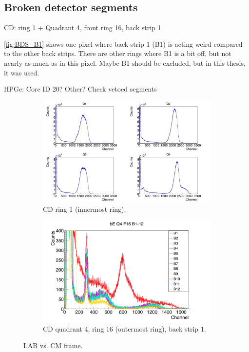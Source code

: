\documentclass[twoside,english]{uiofysmaster/uiofysmaster}
\begin{document}
\subsection{Broken detector segments}

CD: ring 1 + Quadrant 4, front ring 16, back strip 1 \newline

\autoref{fig:BDS_B1} shows one pixel where back strip 1 (B1) is acting weird compared to the other back strips. There are other rings where B1 is a bit off, but not nearly as much as in this pixel. Maybe B1 should be excluded, but in this thesis, it was used. 

\bigskip

HPGe: Core ID 20? Other? Check vetoed segments


\begin{figure}[ht]
	\centering
	\begin{subfigure}{\textwidth}
		\centering
		\includegraphics[width=\textwidth]{../Plots/plotting/Q1-4_f1.png}
		\caption{CD ring 1 (innermost ring).}
		\label{fig:BDS_R1}
	\end{subfigure}
	\begin{subfigure}{\textwidth}
		\centering
		\includegraphics[width=\textwidth]{../Plots/plotting/bE_Q4_f16_b1-12.png}
		\caption{CD quadrant 4, ring 16 (outermost ring), back strip 1.}
		\label{fig:BDS_B1}
	\end{subfigure}
	\caption{LAB vs. CM frame.}
	\label{fig:BDS}
\end{figure}
\end{document}
